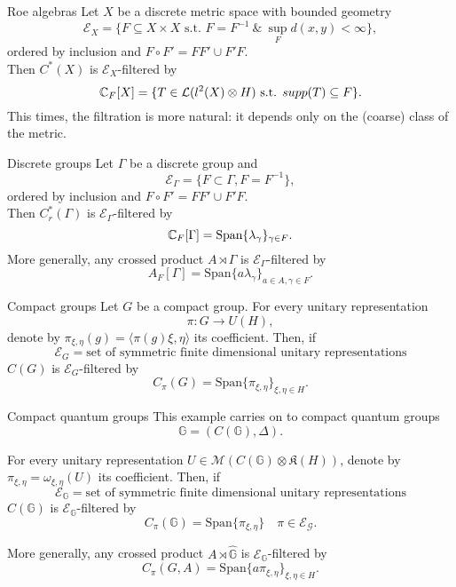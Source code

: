 \begin{frame}{Roe algebras}
Let $X$ be a discrete metric space with bounded geometry
\[\mathcal E_X = \{F\subseteq X\times X \text{ s.t. } F= F^{-1} \ \& \ \sup_{F} d(x,y) < \infty	\},\]
ordered by inclusion and $F\circ F' = FF' \cup F'F$.\\
 \vspace{0.4in}
Then $C^*(X)$ is $\mathcal E_{X}$-filtered by  
\[\mathbb C_F [X] = \{ T\in \mathcal L(l^2(X)\otimes H) \text{ s.t. } supp(T)\subseteq F\}	.\]
This times, the filtration is more natural: it depends only on the (coarse) class of the metric.
\end{frame}

\begin{frame}{Discrete groups}
Let $\Gamma$ be a discrete group and
\[\mathcal E_\Gamma = \{F\subset \Gamma , F= F^{-1}\},\]
ordered by inclusion and $F\circ F' = FF' \cup F'F$.\\
 \vspace{0.4in}
Then $C_r^*(\Gamma)$ is $\mathcal E_{\Gamma}$-filtered by  
\[\mathbb C_F [\Gamma] = \text{Span} \{ \lambda_\gamma\}_{\gamma \in F}.\]
More generally, any crossed product $A\rtimes \Gamma$ is $\mathcal E_{\Gamma}$-filtered by
\[A_F[\Gamma]= \text{Span} \{ a\lambda_\gamma\}_{a \in A ,\gamma \in F}.\]
\end{frame}

\begin{frame}{Compact groups}
Let $G$ be a compact group. For every unitary representation 
\[\pi : G \rightarrow U(H), \] 
denote by $\pi_{\xi,\eta}(g) =\langle \pi(g)\xi ,\eta\rangle$ its coefficient. Then, if 
\[ \mathcal E_G = \text{set of symmetric finite dimensional unitary representations} \]
$C(G)$ is $\mathcal E_G$-filtered by  
\[C_\pi (G) = \text{Span} \{ \pi_{\xi ,\eta}\}_{\xi,\eta\in H}.\]
\end{frame}

\begin{frame}{Compact quantum groups}
This example carries on to compact quantum groups \[\mathbb G = (C(\mathbb G),\Delta).\] 

For every unitary representation $U \in \mathcal M (C(\mathbb G)\otimes \mathfrak K(H))$, denote by $\pi_{\xi,\eta}=\omega_{\xi,\eta} (U)$ its coefficient. Then, if 
\[ \mathcal E_{\mathbb G} = \text{set of symmetric finite dimensional unitary representations} \]
$C(\mathbb G)$ is $\mathcal E_{\mathbb G}$-filtered by  
\[C_\pi (\mathbb G) = \text{Span} \{ \pi_{\xi ,\eta}\} \quad \pi \in \mathcal E_{\mathcal G}.\]

More generally, any crossed product $A\rtimes \hat {\mathbb G}$ is $\mathcal E_{\mathbb G}$-filtered by
\[C_\pi (G,A) = \text{Span} \{ a \pi_{\xi ,\eta}\}_{\xi,\eta\in H}.\]
\end{frame}

